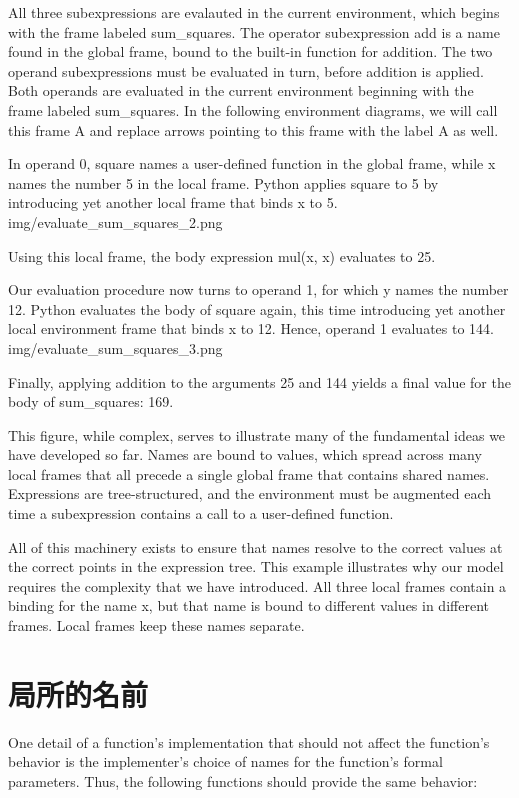 \documentclass[letterpaper,10pt,dvipdfmx]{sphinxmanual}
\begin{document}
All three subexpressions are evalauted in the current environment, which begins with the frame labeled sum\_squares. The operator subexpression add is a name found in the global frame, bound to the built-in function for addition. The two operand subexpressions must be evaluated in turn, before addition is applied. Both operands are evaluated in the current environment beginning with the frame labeled sum\_squares. In the following environment diagrams, we will call this frame A and replace arrows pointing to this frame with the label A as well.

In operand 0, square names a user-defined function in the global frame, while x names the number 5 in the local frame. Python applies square to 5 by introducing yet another local frame that binds x to 5.
img/evaluate\_sum\_squares\_2.png

Using this local frame, the body expression mul(x, x) evaluates to 25.

Our evaluation procedure now turns to operand 1, for which y names the number 12. Python evaluates the body of square again, this time introducing yet another local environment frame that binds x to 12. Hence, operand 1 evaluates to 144.
img/evaluate\_sum\_squares\_3.png

Finally, applying addition to the arguments 25 and 144 yields a final value for the body of sum\_squares: 169.

This figure, while complex, serves to illustrate many of the fundamental ideas we have developed so far. Names are bound to values, which spread across many local frames that all precede a single global frame that contains shared names. Expressions are tree-structured, and the environment must be augmented each time a subexpression contains a call to a user-defined function.

All of this machinery exists to ensure that names resolve to the correct values at the correct points in the expression tree. This example illustrates why our model requires the complexity that we have introduced. All three local frames contain a binding for the name x, but that name is bound to different values in different frames. Local frames keep these names separate.


\section{局所的名前}
\label{functions:id17}
One detail of a function's implementation that should not affect the function's behavior is the implementer's choice of names for the function's formal parameters. Thus, the following functions should provide the same behavior:
\end{document}
